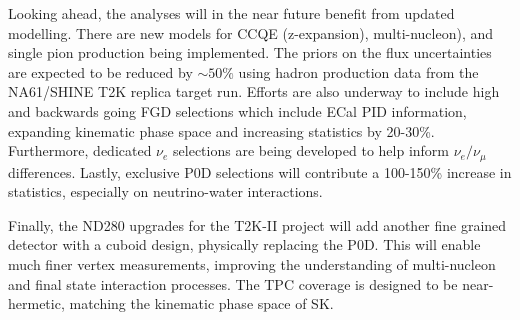 Looking ahead, the analyses will in the near future benefit from updated modelling. There are new models for CCQE (z-expansion\cite{z-exp}), multi-nucleon\cite{nieves1}), and single pion production\cite{thesis_minoo} being implemented. The priors on the flux uncertainties are expected to be reduced by $\sim50\%$\cite{flux_red} using hadron production data from the NA61/SHINE T2K replica target run. Efforts are also underway to include high and backwards going FGD selections which include ECal PID information, expanding kinematic phase space and increasing statistics by 20-30\%. Furthermore, dedicated $\nu_e$ selections are being developed to help inform $\nu_e/\nu_\mu$ differences. Lastly, exclusive P0D selections will contribute a 100-150\% increase in statistics, especially on neutrino-water interactions.

Finally, the ND280 upgrades\cite{t2k_upgrades} for the T2K-II project\cite{t2k_ii} will add another fine grained detector with a cuboid design, physically replacing the P0D. This will enable much finer vertex measurements, improving the understanding of multi-nucleon and final state interaction processes. The TPC coverage is designed to be near-hermetic, matching the kinematic phase space of SK.